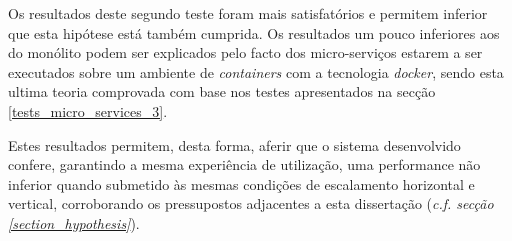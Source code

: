 Os resultados deste segundo teste foram mais satisfatórios e permitem inferior que esta hipótese está também cumprida. Os resultados um pouco inferiores aos do monólito podem ser explicados pelo facto dos micro-serviços estarem a ser executados sobre um ambiente de \emph{containers} com a tecnologia \emph{docker}, sendo esta ultima teoria comprovada com base nos testes apresentados na secção \ref{tests_micro_services_3}.

Estes resultados permitem, desta forma, aferir que o sistema desenvolvido confere, garantindo a mesma experiência de utilização, uma performance não inferior quando submetido às mesmas condições de escalamento horizontal e vertical, corroborando os pressupostos adjacentes a esta dissertação (\emph{c.f. secção \ref{section_hypothesis}}).






